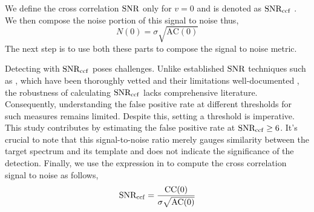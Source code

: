 We define the cross correlation $\rm{SNR}$ only for $v=0$ and is denoted as $\rm{SNR_{ccf}}$ .
We then compose the noise portion of this signal to noise thus,
\begin{equation}
    N(0) = \sigma \sqrt{\textrm{AC}(0)}
\end{equation}
The next step is to use both these parts to compose the signal to noise metric.

Detecting with $\rm{SNR_{ccf}}$ poses challenges. Unlike established $\rm{SNR}$ techniques such as \cite{2014MawetSNR}, which have been thoroughly vetted and their limitations well-documented \citep[e.g., STIM][]{2019Pairet}, the robustness of calculating $\rm{SNR_{ccf}}$ lacks comprehensive literature. Consequently, understanding the false positive rate at different thresholds for such measures remains limited. Despite this, setting a threshold is imperative. This study contributes by estimating the false positive rate at $\rm{SNR_{ccf}}\ge 6$. It's crucial to note that this signal-to-noise ratio merely gauges similarity between the target spectrum and its template and does not indicate the significance of the detection.
Finally, we use the expression in \cite{ruffio2019radial} to compute the cross correlation signal to noise as follows,
\begin{equation}
    \rm{SNR_{ccf}}=\frac{CC(0)}{\sigma \sqrt{\textrm{AC}(0)}}
    \label{eq:ccf-snr}
\end{equation}

